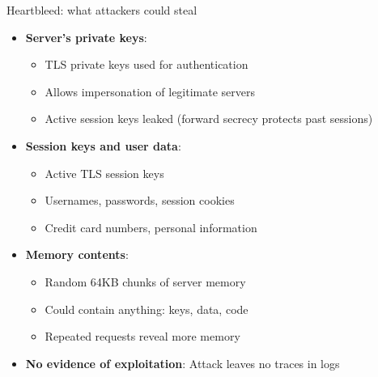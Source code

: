 \ifdefined\PRESENTATION\else\PassOptionsToClass{handout}{beamer}\fi\documentclass[aspectratio=169, lualatex]{beamer}
\begin{document}
\begin{frame}{Heartbleed: what attackers could steal}
	\begin{itemize}
		\item \textbf{Server's private keys}:
		      \begin{itemize}
			      \item TLS private keys used for authentication
			      \item Allows impersonation of legitimate servers
			      \item Active session keys leaked (forward secrecy protects past sessions)
		      \end{itemize}
		\item \textbf{Session keys and user data}:
		      \begin{itemize}
			      \item Active TLS session keys
			      \item Usernames, passwords, session cookies
			      \item Credit card numbers, personal information
		      \end{itemize}
		\item \textbf{Memory contents}:
		      \begin{itemize}
			      \item Random 64KB chunks of server memory
			      \item Could contain anything: keys, data, code
			      \item Repeated requests reveal more memory
		      \end{itemize}
		\item \textbf{No evidence of exploitation}: Attack leaves no traces in logs
	\end{itemize}
\end{frame}
\end{document}
